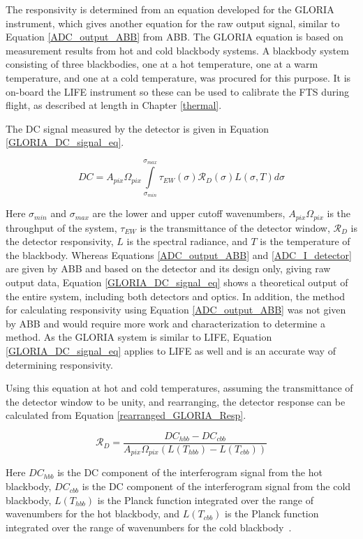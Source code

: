 The responsivity is determined from an equation developed for the GLORIA instrument, which gives another equation for the raw output signal, similar to Equation \ref{ADC_output_ABB} from ABB. The GLORIA equation is based on measurement results from hot and cold blackbody systems. A blackbody system consisting of three blackbodies, one at a hot temperature, one at a warm temperature, and one at a cold temperature, was procured for this purpose. It is on-board the LIFE instrument so these can be used to calibrate the FTS during flight, as described at length in Chapter \ref{thermal}.

The DC signal measured by the detector is given in Equation \ref{GLORIA_DC_signal_eq}.

\begin{equation} \label{GLORIA_DC_signal_eq}
    DC = A_{pix}\Omega_{pix}\int\limits_{\sigma_{min}}^{\sigma_{max}}\tau_{EW}(\sigma)\mathcal{R}_D(\sigma)L(\sigma, T)d\sigma
\end{equation}

Here $\sigma_{min}$ and $\sigma_{max}$ are the lower and upper cutoff wavenumbers, $A_{pix}\Omega_{pix}$ is the throughput of the system, $\tau_{EW}$ is the transmittance of the detector window, $\mathcal{R}_D$ is the detector responsivity, $L$ is the spectral radiance, and $T$ is the temperature of the blackbody. Whereas Equations \ref{ADC_output_ABB} and \ref{ADC_I_detector} are given by ABB and based on the detector and its design only, giving raw output data, Equation \ref{GLORIA_DC_signal_eq} shows a theoretical output of the entire system, including both detectors and optics. In addition, the method for calculating responsivity using Equation \ref{ADC_output_ABB} was not given by ABB and would require more work and characterization to determine a method. As the GLORIA system is similar to LIFE, Equation \ref{GLORIA_DC_signal_eq} applies to LIFE as well and is an accurate way of determining responsivity.

Using this equation at hot and cold temperatures, assuming the transmittance of the detector window to be unity, and rearranging, the detector response can be calculated from Equation \ref{rearranged_GLORIA_Resp}.

\begin{equation} \label{rearranged_GLORIA_Resp}
    \mathcal{R}_D = \frac{DC_{hbb} - DC_{cbb}}{A_{pix}\Omega_{pix}(L(T_{hbb})-L(T_{cbb}))}
\end{equation}

Here $DC_{hbb}$ is the DC component of the interferogram signal from the hot blackbody, $DC_{cbb}$ is the DC component of the interferogram signal from the cold blackbody, $L(T_{hbb})$ is the Planck function integrated over the range of wavenumbers for the hot blackbody, and $L(T_{cbb})$ is the Planck function integrated over the range of wavenumbers for the cold blackbody~\citep{GLORIA_PhD}. 

